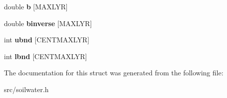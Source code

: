 \begin{DoxyCompactItemize}
\item 
\hypertarget{struct_l_a_y_e_r_p_a_r___s_a8476332b3c7585348353c1b4078b80c9}{double {\bfseries b} \mbox{[}M\-A\-X\-L\-Y\-R\mbox{]}}\label{struct_l_a_y_e_r_p_a_r___s_a8476332b3c7585348353c1b4078b80c9}

\item 
\hypertarget{struct_l_a_y_e_r_p_a_r___s_a057ac97690cfd58bba37598ffdcfbfb5}{double {\bfseries binverse} \mbox{[}M\-A\-X\-L\-Y\-R\mbox{]}}\label{struct_l_a_y_e_r_p_a_r___s_a057ac97690cfd58bba37598ffdcfbfb5}

\item 
\hypertarget{struct_l_a_y_e_r_p_a_r___s_a941e52fbffb3d64ae19cdde9ab930c13}{int {\bfseries ubnd} \mbox{[}C\-E\-N\-T\-M\-A\-X\-L\-Y\-R\mbox{]}}\label{struct_l_a_y_e_r_p_a_r___s_a941e52fbffb3d64ae19cdde9ab930c13}

\item 
\hypertarget{struct_l_a_y_e_r_p_a_r___s_aaecce7b10bff1082e3181e167339ebb6}{int {\bfseries lbnd} \mbox{[}C\-E\-N\-T\-M\-A\-X\-L\-Y\-R\mbox{]}}\label{struct_l_a_y_e_r_p_a_r___s_aaecce7b10bff1082e3181e167339ebb6}

\end{DoxyCompactItemize}


The documentation for this struct was generated from the following file\-:\begin{DoxyCompactItemize}
\item 
src/soilwater.\-h\end{DoxyCompactItemize}
